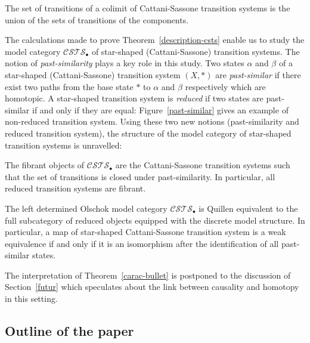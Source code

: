 \documentclass[a4paper,12pt]{amsart}
\newenvironment{customthm}[1]
  {\innercustomthm}
  {\endinnercustomthm}
\begin{document}
\begin{customthm}{\ref{colim-csts}} The set of transitions of a
  colimit of Cattani-Sassone transition systems is the union of the
  sets of transitions of the components.
\end{customthm}

The calculations made to prove Theorem~\ref{description-csts} enable
us to study the model category ${\mathcal{C\!S\!T\!S}}_\bullet$ of star-shaped
(Cattani-Sassone) transition systems. The notion of
\emph{past-similarity} plays a key role in this study. Two states
$\alpha$ and $\beta$ of a star-shaped (Cattani-Sassone) transition
system $(X,*)$ are \emph{past-similar} if there exist two paths from
the base state $*$ to $\alpha$ and $\beta$ respectively which are
homotopic. A star-shaped transition system is \emph{reduced} if two
states are past-similar if and only if they are equal:
Figure~\ref{past-similar} gives an example of non-reduced transition
system. Using these two new notions (past-similarity and reduced
transition system), the structure of the model category of star-shaped
transition systems is unravelled:

\begin{customthm}{\ref{fib-carac}}
  The fibrant objects of ${\mathcal{C\!S\!T\!S}}_\bullet$ are the Cattani-Sassone
  transition systems such that the set of transitions is closed under
  past-similarity. In particular, all reduced transition systems are
  fibrant.
\end{customthm}

\begin{customthm}{\ref{carac-bullet}}
  The left determined Olschok model category ${\mathcal{C\!S\!T\!S}}_\bullet$ is
  Quillen equivalent to the full subcategory of reduced objects
  equipped with the discrete model structure. In particular, a map of
  star-shaped Cattani-Sassone transition system is a weak equivalence
  if and only if it is an isomorphism after the identification of all
  past-similar states.
\end{customthm}

The interpretation of Theorem~\ref{carac-bullet} is postponed to the
discussion of Section~\ref{futur} which speculates about the link between 
causality and homotopy in this setting.

\subsection{Outline of the paper}
\end{document}
